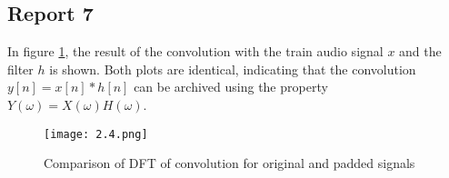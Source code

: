 \subsection*{Report 7}
In figure \ref{figure:2_4}, the result of the convolution with the train audio signal $x$ and the filter $h$ is shown. Both plots are identical, indicating that the convolution $ y[n] = x[n] \ast h[n] $ can be archived using the property $ Y(\omega) = X(\omega) H(\omega) $.
	\begin{figure}[H] 
		\centering
		\texttt{[image: 2.4.png]}
		\caption{Comparison of DFT of convolution for original and padded signals}
		\label{figure:2_4}
	\end{figure}
	